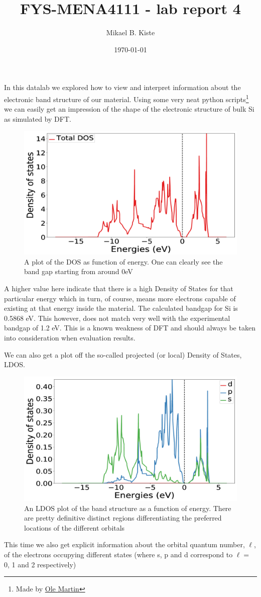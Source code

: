 \documentclass[a4paper,10pt]{article}
\date{\today}
\title{FYS-MENA4111 - lab report 4}
\author{Mikael B. Kiste}
\begin{document}
	\maketitle
In this datalab we explored how to view and interpret information about the electronic band structure of our material.
Using some very neat python scripts\footnote{Made by \href{https://www.mn.uio.no/fysikk/english/people/aca/olem/}{Ole Martin}} we can easily get an impression of the shape of the electronic structure of bulk Si as simulated by DFT.
\begin{figure}[H]
	\centering
	\includegraphics[width=0.7\linewidth]{TDOS}
	\caption{A plot of the DOS as function of energy. One can clearly see the band gap starting from around 0eV}
	\label{fig:tdos}
\end{figure}
A higher value here indicate that there is a high Density of States for that particular energy which in turn, of course, means more electrons capable of existing at that energy inside the material.
The calculated bandgap for Si is 0.5868 eV. This however, does not match very well with the experimental bandgap of 1.2 eV. This is a known weakness of DFT and should always be taken into consideration when evaluation results.

\newpage
We can also get a plot off the so-called projected (or local) Density of States, LDOS.
\begin{figure}[H]
	\centering
	\includegraphics[width=0.7\linewidth]{LDOS1}
	\caption{An LDOS plot of the band structure as a function of energy. There are pretty definitive distinct regions differentiating the preferred locations of the different orbitals}
	\label{fig:ldos1}
\end{figure}
This time we also get explicit information about the orbital quantum number, $\ell$, of the electrons occupying different states (where s, p and d correspond to $\ell=$ 0, 1 and 2 respectively)\\
\end{document}
